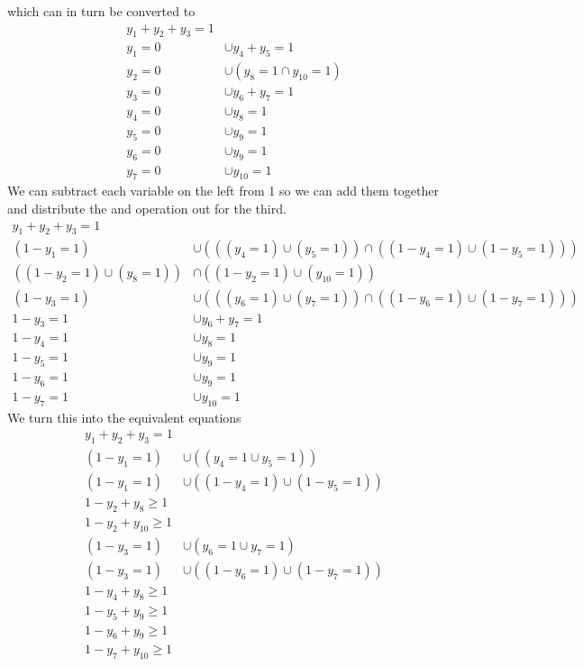 \documentclass[11pt]{article}
\begin{document}
which can in turn be converted to
\begin{align*}
  y_1 + y_2 + y_3 = 1 \\
  y_1 = 0 & \cup y_4 + y_5 = 1 \\
  y_2 = 0 & \cup (y_8 =1 \cap y_{10} = 1)  \\
  y_3 = 0 & \cup y_6 + y_7 = 1 \\
  y_4 = 0 & \cup y_8 = 1 \\
  y_5 = 0 & \cup y_9 = 1 \\
  y_6 = 0 & \cup y_9 = 1 \\
  y_7 = 0 & \cup y_{10} =1
\end{align*}
We can subtract each variable on the left from 1 so we can add them together and distribute the and operation out for the third.
\begin{align*}
  y_1 + y_2 + y_3 = 1 \\
 ( 1-y_1 = 1) & \cup( ((y_4=1)\cup (y_5=1)) \cap ((1-y_4=1)\cup (1-y_5=1))) \\
 (( 1-y_2 = 1) \cup (y_8 = 1)) & \cap ( ( 1-y_2 = 1) \cup (y_{10} = 1))  \\
( 1-y_3 = 1) & \cup( ((y_6=1)\cup (y_7=1)) \cap ((1-y_6=1)\cup (1-y_7=1))) \\
  1-y_3 = 1 & \cup y_6 + y_7 = 1 \\
  1-y_4 = 1 & \cup y_8 = 1 \\
  1-y_5 = 1 & \cup y_9 = 1 \\
  1-y_6 = 1 & \cup y_9 = 1 \\
  1-y_7 = 1 & \cup y_{10} =1
\end{align*}
We turn this into the equivalent equations
\begin{align*}
  y_1 + y_2 + y_3 = 1 \\
  (1-y_1 = 1) &\cup ((y_4=1\cup y_5=1))\\
  (1-y_1 = 1) &\cup ((1-y_4=1)\cup (1-y_5=1)) \\
  1-y_2 + y_8 \geq 1 \\
  1-y_2 + y_{10} \geq 1 \\
  (1-y_3 = 1) & \cup (y_6=1\cup y_7=1) \\
  (1-y_3 = 1) & \cup ((1-y_6=1)\cup (1-y_7=1)) \\
  1-y_4 + y_8 \geq 1 \\
  1-y_5+ y_9 \geq 1 \\
  1-y_6 + y_9 \geq 1 \\
  1-y_7 + y_{10} \geq 1
\end{align*}
\end{document}
